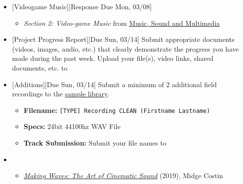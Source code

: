 \def\dMon{Mon, 03/08}
\def\dTues{Tues, 03/09}
\def\dWed{Wed, 03/10}
\def\dThur{Thur, 03/11}
\def\dFri{Fri, 03/12}
\def\dSat{Sat, 03/13}
\def\dSun{Sun, 03/14}
\placeDate

\begin{itemize}[noitemsep,topsep=0pt,leftmargin=*]
	\item {}[Videogame Music][Response Due \dMon]
	      \begin{itemize}
		      \item \emph{Section 2: Video-game Music} from \href{supplements/Music_Sound_and_Multimedia_-_From_the_Live_to_the_Virtual_(Music_and_the_Moving_Image)_(2008).pdf}{Music, Sound and Multimedia}
	      \end{itemize}

	\item {}[Project Progress Report][Due \dSun] \newline
	      Submit appropriate documents (videos, images, audio, etc.) that clearly demonstrate the progress you have made during the past week. Upload your file(s), video links, shared documents, etc. to \discordE
	\item {}[Additions][Due \dSun] \newline
	      Submit a minimum of 2 additional field recordings to the \href{\samplelibPermURL}{sample library}.
	      \begin{itemize}
		      \item \textbf{Filename:} \texttt{[TYPE] Recording CLEAN (Firstname Lastname)}
		      \item \textbf{Specs:} 24bit 44100hz WAV File
		      \item \textbf{Track Submission:} Submit your file names to \discordS
	      \end{itemize}
	\item {}
	      \begin{itemize}
		      \item \href{https://www.youtube.com/watch?v=xsckp8r1-8c}{\emph{Making Waves: The Art of Cinematic Sound}} (2019), Midge Costin
	      \end{itemize}
\end{itemize}